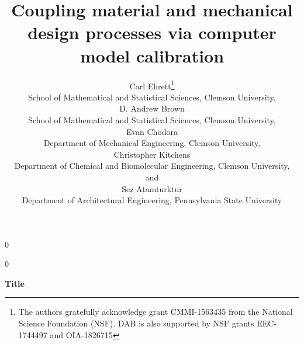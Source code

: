 \documentclass[12pt]{article}
\newcommand{\blind}{0}
\begin{document}
%

\def\spacingset#1{\renewcommand{\baselinestretch}%
{#1}\small\normalsize} \spacingset{1}



\blind
{
  \title{\bf Coupling material and mechanical design processes via computer model calibration}
  \author{Carl Ehrett\thanks{
    The authors gratefully acknowledge grant CMMI-1563435 from the National Science Foundation (NSF). DAB is also supported by NSF grants EEC-1744497 and OIA-1826715}\hspace{.2cm}\\
    School of Mathematical and Statistical Sciences, Clemson University,\\
    D. Andrew Brown \\
    School of Mathematical and Statistical Sciences, Clemson University,\\
    Evan Chodora \\
    Department of Mechanical Engineering, Clemson University,\\
    Christopher Kitchens \\
    Department of Chemical and Biomolecular Engineering, Clemson University,\\
    and \\
    Sez Atamturktur \\
    Department of Architectural Engineering, Pennsylvania State University\\}
  \maketitle
} \fi

\blind
{
  \bigskip
  \bigskip
  \bigskip
  \begin{center}
    {\LARGE\bf Title}
\end{center}
  \medskip
} \fi
\end{document}
